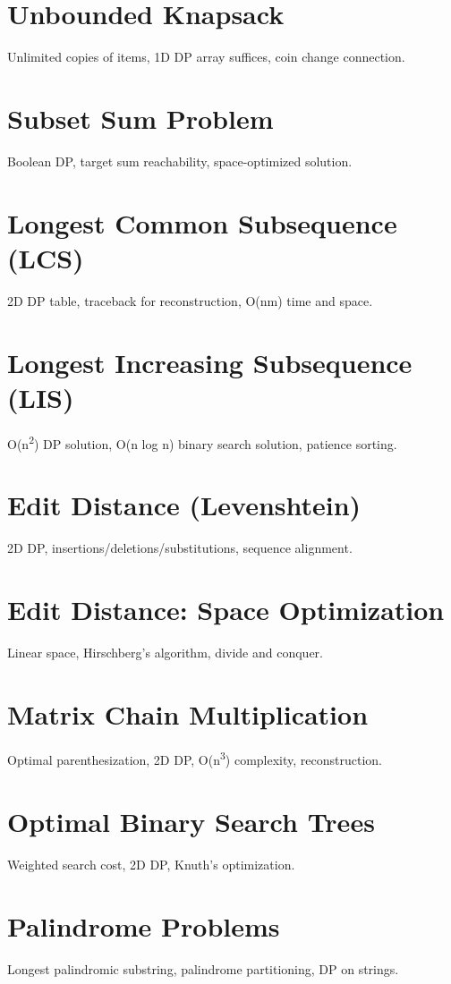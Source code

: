 \chapter{Unbounded Knapsack}
Unlimited copies of items, 1D DP array suffices, coin change connection.

\chapter{Subset Sum Problem}
Boolean DP, target sum reachability, space-optimized solution.

\chapter{Longest Common Subsequence (LCS)}
2D DP table, traceback for reconstruction, O(nm) time and space.

\chapter{Longest Increasing Subsequence (LIS)}
O(n\textsuperscript{2}) DP solution, O(n log n) binary search solution, patience sorting.

\chapter{Edit Distance (Levenshtein)}
2D DP, insertions/deletions/substitutions, sequence alignment.

\chapter{Edit Distance: Space Optimization}
Linear space, Hirschberg's algorithm, divide and conquer.

\chapter{Matrix Chain Multiplication}
Optimal parenthesization, 2D DP, O(n\textsuperscript{3}) complexity, reconstruction.

\chapter{Optimal Binary Search Trees}
Weighted search cost, 2D DP, Knuth's optimization.

\chapter{Palindrome Problems}
Longest palindromic substring, palindrome partitioning, DP on strings.

